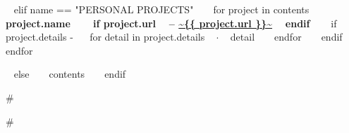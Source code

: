 \begin{minipage}{\textwidth}
~{ elif name == "PERSONAL PROJECTS" }~
  ~{ for project in contents }~
    {\small\bf ~{{ project.name }}~ ~{ if project.url }~ -- \color{maincolor}\url{~{{ project.url }}~} ~{ endif }~ }
    \vspace{1mm}
    ~{ if project.details -}~
    ~{ for detail in project.details }~
      $\cdot$ \small ~{{ detail }}~
    ~{ endfor }~
    ~{ endif }~
    \vspace{3mm}
  ~{ endfor }~
  \vspace{15mm}


\vspace{10mm}
~{ else }~
  ~{{ contents }}~
  \bigskip
~{ endif }~
\end{minipage}



{#

    
#}


